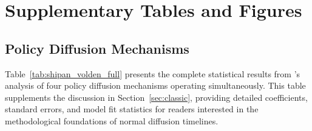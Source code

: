 \documentclass[12pt]{report}
\begin{document}
\tableofcontents
\listoffigures
\listoftables















\appendices
\chapter{Supplementary Tables and Figures}
\label{app:A}

\section{Policy Diffusion Mechanisms}
\label{app:diffusion_mechanisms}
Table~\ref{tab:shipan_volden_full} presents the complete statistical results from
\textcite{shipanMechanismsPolicyDiffusion2008a}'s analysis of four policy diffusion
mechanisms operating simultaneously. This table supplements the discussion in
Section~\ref{sec:classic}, providing detailed coefficients, standard errors, and
model fit statistics for readers interested in the methodological foundations of
normal diffusion timelines.
\end{document}
